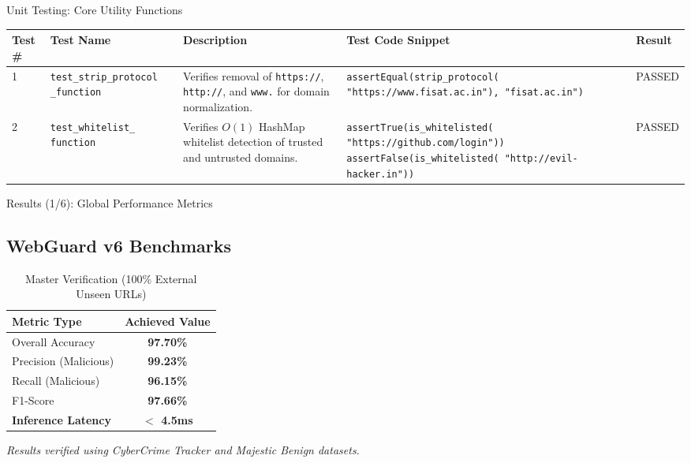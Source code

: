 \documentclass[aspectratio=169,xcolor=dvipsnames]{beamer}
\begin{document}
\begin{frame}{Unit Testing: Core Utility Functions}

\begin{table}[h]
\centering
\scriptsize
\renewcommand{\arraystretch}{1.5}

\begin{tabular}{|p{0.8cm}|p{2.5cm}|p{3.2cm}|p{4.2cm}|p{1.2cm}|}
\hline
\textbf{Test \#} & \textbf{Test Name} & \textbf{Description} & \textbf{Test Code Snippet} & \textbf{Result} \\ \hline

1 & \texttt{test\_strip\_protocol} \newline \texttt{\_function} & 
Verifies removal of \texttt{https://}, \texttt{http://}, and \texttt{www.} for domain normalization. & 
\texttt{assertEqual(strip\_protocol( "https://www.fisat.ac.in"), "fisat.ac.in")} & 
PASSED \\ \hline

2 & \texttt{test\_whitelist\_} \newline \texttt{function} & 
Verifies $O(1)$ HashMap whitelist detection of trusted and untrusted domains. & 
\texttt{assertTrue(is\_whitelisted( "https://github.com/login"))} \newline \texttt{assertFalse(is\_whitelisted( "http://evil-hacker.in"))} & 
PASSED \\ \hline

\end{tabular}
\end{table}

\end{frame}

\begin{frame}{Results (1/6): Global Performance Metrics}
\subsection{WebGuard v6 Benchmarks}
\begin{table}[htbp]
\centering
\caption{Master Verification (100\% External Unseen URLs)}
\renewcommand{\arraystretch}{1.1}
\begin{tabular}{|l|c|}
\hline
\textbf{Metric Type} & \textbf{Achieved Value} \\
\hline
Overall Accuracy & \textbf{97.70\%} \\
\hline
Precision (Malicious) & \textbf{99.23\%} \\
\hline
Recall (Malicious) & \textbf{96.15\%} \\
\hline
F1-Score & \textbf{97.66\%} \\
\hline
\textbf{Inference Latency} & \textbf{$<$ 4.5ms} \\
\hline
\end{tabular}
\end{table}
\textit{Results verified using CyberCrime Tracker and Majestic Benign datasets.}
\end{frame}
\end{document}
